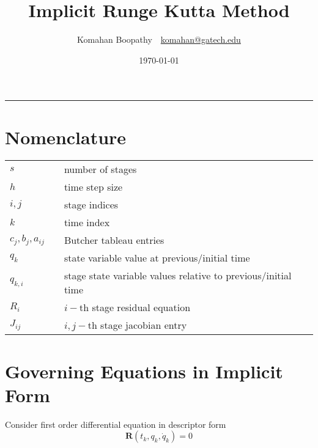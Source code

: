 \documentclass[pdftex,11pt,letter]{article}
\title{\textbf{Implicit Runge Kutta Method}}
\author{Komahan Boopathy~~\url{komahan@gatech.edu}} \date{\today}
\begin{document}
\maketitle
\vspace{-0.25in}
\rule{\linewidth}{2pt}



\section*{Nomenclature}
\begin{minipage}[b]{0.5\linewidth}\centering
\begin{tabular}{@{}lcl@{}}
$s$   && number of stages\\
$h$   && time step size \\
$i,j$ && stage indices \\
$k$   && time index \\
$c_j,b_j,a_{ij}$ && Butcher tableau entries \\
$q_k$ && state variable value at previous/initial time \\
$q_{k,i}$ && stage state variable values relative to previous/initial time \\
$R_i$  && $i-$th stage residual equation \\
$J_{ij}$  && $i,j-$th stage jacobian entry \\
\end{tabular}
\end{minipage}


\section{Governing Equations in Implicit Form}

Consider first order differential equation in descriptor form
\begin{equation}
  \mathbf{R}(t_k, q_k, \dot{q}_k) = 0
\end{equation}
\end{document}
